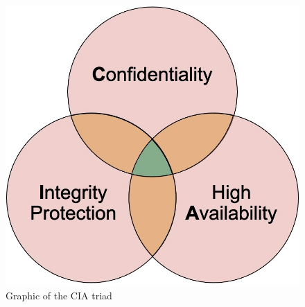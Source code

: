 
\begin{figure}[t]
	\includegraphics[scale=0.12]{pictures/cia_triad}
	\caption{Graphic of the CIA triad}
	\label{cia}
\end{figure}

